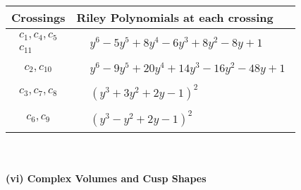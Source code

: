 \documentclass[1p]{elsarticle_modified}
\theoremstyle{definition}
\begin{document}
\begin{tabular}{m{50pt}|m{274pt}}
Crossings & \hspace{64pt}Riley Polynomials at each crossing \\
\hline $$\begin{aligned}c_{1},c_{4},c_{5}\\c_{11}\end{aligned}$$&$\begin{aligned}
&y^6-5 y^5+8 y^4-6 y^3+8 y^2-8 y+1
\end{aligned}$\\
\hline $$\begin{aligned}c_{2},c_{10}\end{aligned}$$&$\begin{aligned}
&y^6-9 y^5+20 y^4+14 y^3-16 y^2-48 y+1
\end{aligned}$\\
\hline $$\begin{aligned}c_{3},c_{7},c_{8}\end{aligned}$$&$\begin{aligned}
&(y^3+3 y^2+2 y-1)^2
\end{aligned}$\\
\hline $$\begin{aligned}c_{6},c_{9}\end{aligned}$$&$\begin{aligned}
&(y^3- y^2+2 y-1)^2
\end{aligned}$\\
\hline
\end{tabular}\\~\\
\newpage\flushleft \textbf{(vi) Complex Volumes and Cusp Shapes}
\end{document}
